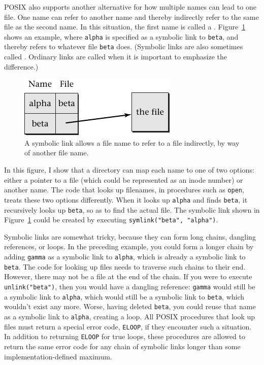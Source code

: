 POSIX also supports another alternative for how multiple names can
lead to one file. One name can refer to another name and
thereby indirectly refer to the same file as the second name.  In this
situation, the first name is called a .
Figure~\ref{symlink} shows an example, where \verb|alpha| is specified
as a symbolic link to \verb|beta|, and thereby refers to
whatever file \verb|beta| does.  (Symbolic links are also sometimes
called .  Ordinary links are called
 when it is important to emphasize the difference.)
\begin{figure}
\centerline{\includegraphics{hail_f0817}}
\caption{A symbolic link allows a file name to refer to a file
indirectly, by way of another file name.}\label{symlink}
\end{figure}
In this figure, I show that a directory can map each name to one of
two options: either a pointer to a file (which could be represented as
an inode number) or another name.  The code that looks up filenames,
in procedures such as \verb|open|, treats these two options
differently.  When it looks up \verb|alpha| and finds \verb|beta|, it
recursively looks up \verb|beta|, so as to find the actual file.
The symbolic link shown in Figure~\ref{symlink} could be created by executing
\verb|symlink("beta", "alpha")|.

Symbolic links are somewhat tricky, because they can form long chains,
dangling references, or loops.  In the preceding example, you could form a
longer chain by adding \verb|gamma| as a symbolic link to \verb|alpha|,
which is already a symbolic link to \verb|beta|.  The code for looking
up files needs to traverse such chains to their end.  However, there
may not be a file at the end of the chain.  If you were to execute
\verb|unlink("beta")|, then you would have a dangling reference:
\verb|gamma| would still be a symbolic link to \verb|alpha|, which would
still be a symbolic link to \verb|beta|, which wouldn't exist any more.
Worse, having deleted \verb|beta|, you could reuse that name as a
symbolic link to \verb|alpha|, creating a loop. All POSIX
procedures that look up files must return a special error code,
\verb|ELOOP|, if they encounter such a situation.  In addition to
returning \verb|ELOOP| for true loops, these procedures
are allowed to return the same error code for any chain of symbolic
links longer than some implementation-defined maximum.

